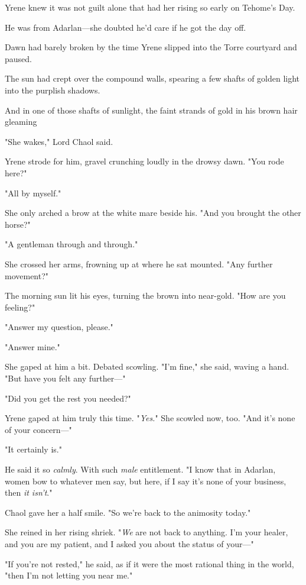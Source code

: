Yrene knew it was not guilt alone that had her rising so early on Tehome's Day.

He was from Adarlan---she doubted he'd care if he got the day off.

Dawn had barely broken by the time Yrene slipped into the Torre courtyard and paused.

The sun had crept over the compound walls, spearing a few shafts of golden light into the purplish shadows.

And in one of those shafts of sunlight, the faint strands of gold in his brown hair gleaming 

"She wakes," Lord Chaol said.

Yrene strode for him, gravel crunching loudly in the drowsy dawn.
"You rode here?"

"All by myself."

She only arched a brow at the white mare beside his.
"And you brought the other horse?"

"A gentleman through and through."

She crossed her arms, frowning up at where he sat mounted.
"Any further movement?"

The morning sun lit his eyes, turning the brown into near-gold.
"How are you feeling?"

"Answer my question, please."

"Answer mine."

She gaped at him a bit.
Debated scowling.
"I'm fine," she said, waving a hand.
"But have you felt any further---"

"Did you get the rest you needed?"

Yrene gaped at him truly this time.
"\emph{Yes.}" She scowled now, too.
"And it's none of your concern---"

"It certainly is."

He said it so \emph{calmly}.
With such \emph{male} entitlement.
"I know that in Adarlan, women bow to whatever men say, but here, if I say it's none of your business, then \emph{it isn't}."

Chaol gave her a half smile.
"So we're back to the animosity today."

She reined in her rising shriek.
"\emph{We} are not back to anything.
I'm your healer, and you are my patient, and I asked you about the status of your---"

"If you're not rested," he said, as if it were the most rational thing in the world, "then I'm not letting you near me."

